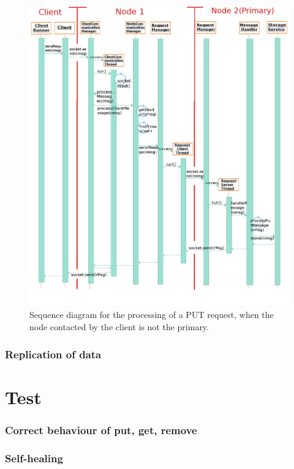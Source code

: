 \documentclass{article}
\begin{document}
\begin{figure}[h]
\centering
\includegraphics[scale=0.32]{sequence_diagram_complete}
\caption{Sequence diagram for the processing of a PUT request, when the node contacted by the client is not the primary.}
\label{fig:sequence_diagram_complete}
\end{figure}



\subsubsection{Replication of data} 

\section{Test}

\subsubsection{Correct behaviour of put, get, remove} 

\subsubsection{Self-healing } 
\end{document}
